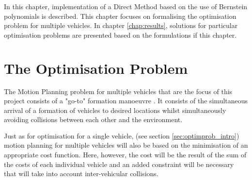 \cleardoublepage
\label{chap:implementation}

\par In this chapter, implementation of a Direct Method based on the use of Bernstein polynomials is described. This chapter focuses on formalising the optimisation problem for multiple vehicles. In chapter \ref{chap:results}, solutions for particular optimisation problems are presented based on the formulations if this chapter.

\section{The Optimisation Problem}
\label{sec:theoptproblem}

\par The Motion Planning problem for multiple vehicles that are the focus of this project consists of a "go-to" formation manoeuvre \cite{sabetghadam2018cooperative}. It consists of the simultaneous arrival of a formation of vehicles to desired locations whilst simultaneously avoiding collisions between each other and the environment.
\par Just as for optimisation for a single vehicle, (see section \ref{sec:optimprob_intro}) motion planning for multiple vehicles will also be based on the minimisation of an appropriate cost function. Here, however, the cost will be the result of the sum of the costs of each individual vehicle and an added constraint will be necessary that will take into account inter-vehicular collisions. 

